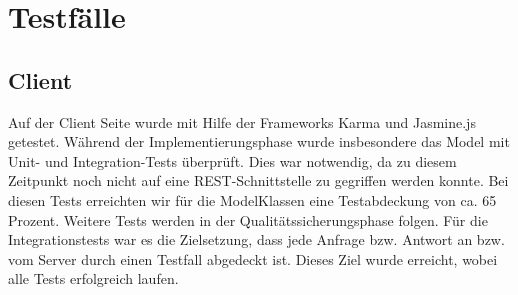 \section{Testfälle}
\subsection{Client}
Auf der Client Seite wurde mit Hilfe der Frameworks Karma und Jasmine.js getestet.
Während der Implementierungsphase wurde insbesondere das Model mit Unit- und Integration-Tests überprüft.
Dies war notwendig, da zu diesem Zeitpunkt noch nicht auf eine REST-Schnittstelle zu gegriffen werden konnte.
Bei diesen Tests erreichten wir für die ModelKlassen eine Testabdeckung von ca. 65 Prozent. Weitere Tests werden in der Qualitätssicherungsphase folgen.
Für die Integrationstests war es die Zielsetzung, dass jede Anfrage bzw. Antwort an bzw. vom Server durch einen Testfall abgedeckt ist.
Dieses Ziel wurde erreicht, wobei alle Tests erfolgreich laufen.

